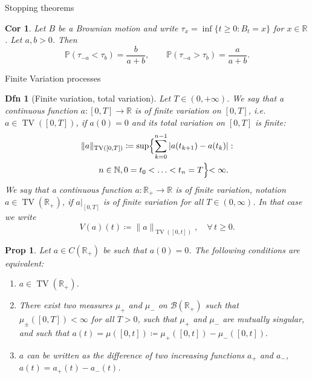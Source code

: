 \documentclass[a4paper]{article}
\theoremstyle{mytheoremstyle}
\newtheorem{definition}{Dfn}
\newtheorem{proposition}{Prop}
\newtheorem{corollary}{Cor}[theorem]
\newcommand{\1}{\mathds{1}}
\begin{document}
\begin{multicols*}{3}
\begin{roundbox}{Stopping theorems}
\begin{corollary}
  \label{cor:brownian.thresholds}Let $B$ be a Brownian motion and write
  $\tau_x = \inf \{t \geqslant 0 : B_t = x\}$ for $x \in \mathbb{R}$. Let $a,
  b > 0$. Then
  \[ \mathbb{P} (\tau_{- a} < \tau_b) = \frac{b}{a + b}, \qquad \mathbb{P}
     (\tau_{- a} > \tau_b) = \frac{a}{a + b} . \]
\end{corollary}
\end{roundbox}

\begin{roundbox}{Finite Variation processes}
\begin{definition}[Finite variation, total variation]
  Let $T \in (0, + \infty)$. We say that a continuous function $a : [0, T]
  \rightarrow \mathbb{R}$ is of {\emph{finite variation}} on $[0, T]$, i.e. $a
  \in \operatorname{TV} ([0, T])$, if $a (0) = 0$ and its {\emph{total variation}} on
  $[0, T]$ is finite:
  \begin{align*}
    \| a \|_{\operatorname{TV} ([0, T])} \coloneq \sup \Bigl\{ \sum_{k = 0}^{n - 1}
      |a (t_{k + 1}) - a (t_k) | &:\\
      n \in \mathbb{N}, 0 = t_0 < \ldots < t_n = T \Bigl\} < \infty .
   \end{align*}
  We say that a continuous function $a : \mathbb{R}_+ \rightarrow \mathbb{R}$
  is of {\emph{finite variation}}, notation $a \in \operatorname{TV} (\mathbb{R}_+)$,
  if $a|_{[0, T]}$ is of finite variation for all $T \in (0, \infty)$. In that
  case we write
  \[ V (a) (t) \coloneq \| a \|_{\operatorname{TV} ([0, t])}, \quad \forall \, t
     \geqslant 0. \]
\end{definition}

\begin{proposition}
  Let $a \in C (\mathbb{R}_+)$ be such that $a (0) = 0$. The following
  conditions are equivalent:
  \begin{enumerate}
    \item $a \in \operatorname{TV} (\mathbb{R}_+)$.
    
    \item There exist two measures $\mu_+$ and $\mu_-$ on $\mathcal{B}
    (\mathbb{R}_+)$ such that $\mu_{\pm} ([0, T]) < \infty$ for all $T > 0$,
    such that $\mu_+$ and $\mu_-$ are mutually singular, and such that
    $ a (t) = \mu ([0, t]) \coloneq \mu_+ ([0, t]) - \mu_- ([0, t]) .$
    \item $a$ can be written as the difference of two increasing functions
    $a_+$ and $a_-$, $a (t) = a_+ (t) - a_- (t)$.
  \end{enumerate}
\end{proposition}
\end{roundbox}



\end{multicols*}
\end{document}
